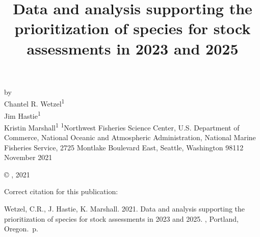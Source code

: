 \documentclass[11pt,
  english,
  a4paper,
]{article}
\date{}
\newcommand{\trTitle}{Data and analysis supporting the prioritization of species for stock assessments in 2023 and 2025}
\newcommand{\trYear}{2021}
\newcommand{\trMonth}{November}
\newcommand{\trAuthsBack}{Wetzel, C.R., J. Hastie, K. Marshall}
\newcommand{\trCitation}{
\begin{hangparas}{1em}{1}
\trAuthsBack{}. \trYear{}. \trTitle{}. \glsentrylong{pfmc}, Portland, Oregon. \pageref{LastPage}{}\,p.
\end{hangparas}}
\begin{document}

\renewcommand*{\thefootnote}{\fnsymbol{footnote}}

\small
\thispagestyle{empty}
\noindent
\begin{center}
\title{Data and analysis supporting the prioritization of species for stock assessments in 2023 and 2025}
\vspace{1.5cm}
{\Large\textbf{}}
\vfill
by\\
Chantel R. Wetzel\textsuperscript{1}\\
Jim Hastie\textsuperscript{1}\\
Kristin Marshall\textsuperscript{1}\vfill
\textsuperscript{1}Northwest Fisheries Science Center, U.S. Department of Commerce, National Oceanic and Atmospheric Administration, National Marine Fisheries Service, 2725 Montlake Boulevard East, Seattle, Washington 98112\vfill
\trMonth{} \trYear{}
\end{center}
\clearpage

\thispagestyle{empty}
\vspace*{\fill}
\begin{center}
\copyright{} , \trYear{}\\
\end{center}
\par
\bigskip
\noindent
Correct citation for this publication:
\bigskip
\par
\trCitation{}
\clearpage


\tableofcontents\clearpage
\label{TRlastRoman}
\clearpage

\newpage
\thispagestyle{empty} %

\pagestyle{plain}  %
\renewcommand*{\thefootnote}{\arabic{footnote}}  %
\setcounter{footnote}{0}  %
\renewcommand{\headrulewidth}{0.5pt}
\renewcommand{\footrulewidth}{0.5pt}
\end{document}

